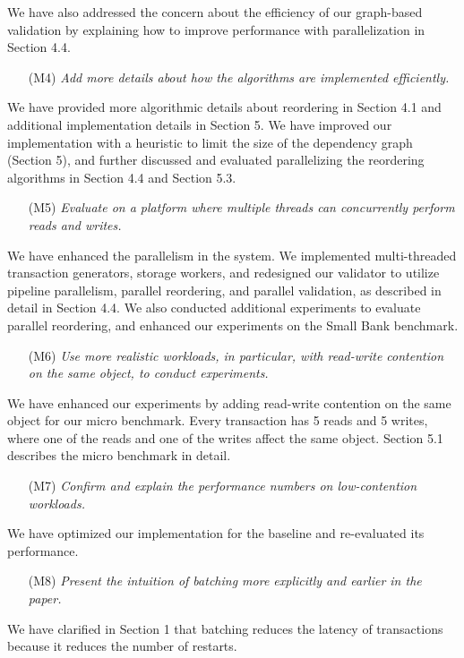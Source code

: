\documentclass{article}
\begin{document}
We have also addressed the concern about the efficiency of our graph-based validation by explaining how to improve performance with parallelization in Section 4.4. 

\begin{itemize}
\item[(M4)]  \emph{Add more details about how the algorithms are implemented efficiently.}
\end{itemize}
We have provided more algorithmic details about reordering in Section 4.1 and additional implementation details in Section 5. We have improved our implementation with a heuristic to limit the size of the dependency graph (Section 5), and further discussed and evaluated parallelizing the reordering algorithms in Section 4.4 and Section 5.3. 

\begin{itemize}
\item[(M5)]  \emph{Evaluate on a platform where multiple threads can concurrently perform reads and writes.}
\end{itemize}
We have enhanced the parallelism in the system. We implemented multi-threaded transaction generators, storage workers, and redesigned our validator to utilize pipeline parallelism, parallel reordering, and parallel validation, as described in detail in Section 4.4. We also conducted additional experiments to evaluate parallel reordering, and enhanced our experiments on the Small Bank benchmark.

\begin{itemize}
\item[(M6)] \emph{Use more realistic workloads, in particular, with read-write contention on the same object, to conduct experiments.}
\end{itemize}
We have enhanced our experiments by adding read-write contention on the same object for our micro benchmark. Every transaction has 5 reads and 5 writes, where one of the reads and one of the writes affect the same object. Section 5.1 describes the micro benchmark in detail.

\begin{itemize}
\item[(M7)] \emph{Confirm and explain the performance numbers on low-contention workloads.}
\end{itemize}
We have optimized our implementation for the baseline and re-evaluated its performance.

\begin{itemize}
\item[(M8)] \emph{Present the intuition of batching more explicitly and earlier in the paper. }
\end{itemize}
We have clarified in Section 1 that batching reduces the latency of transactions because it reduces the number of restarts.
\end{document}
